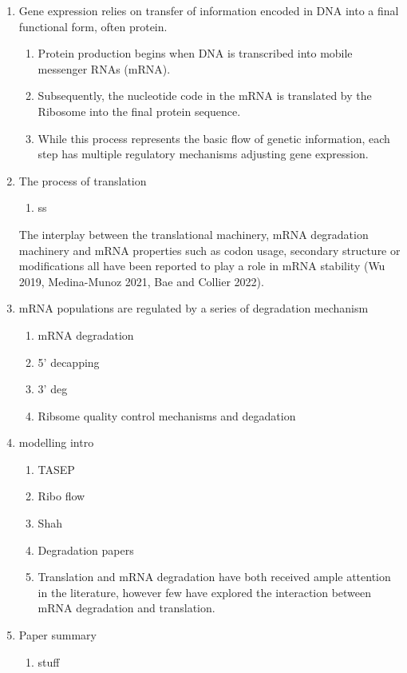 \documentclass[review]{elsarticle}
\begin{document}
\begin{enumerate}
\item Gene expression relies on transfer of information encoded in DNA into a final functional form, often protein. 
\begin{enumerate}	
  \item Protein production begins when DNA is transcribed into mobile messenger RNAs (mRNA).
  \item Subsequently, the nucleotide code in the mRNA is translated by the Ribosome into the final protein sequence. 
  \item While this process represents the basic flow of genetic information, each step has multiple regulatory mechanisms adjusting gene expression.  
\end{enumerate}

\item The process of translation
\begin{enumerate}	
  \item ss
\end{enumerate}

The interplay between the translational machinery, mRNA degradation machinery and mRNA properties such as codon usage, secondary structure or modifications all have been reported to play a role in mRNA stability (Wu 2019, Medina-Munoz 2021, Bae and Collier 2022).


\item mRNA populations are regulated by a series of degradation mechanism
\begin{enumerate}	
  \item mRNA degradation 
  \item 5' decapping
  \item 3' deg
  \item Ribsome quality control mechanisms and degadation
\end{enumerate}

\item modelling intro
\begin{enumerate}	
  \item TASEP
  \item Ribo flow
  \item Shah
  \item Degradation papers
  \item Translation and mRNA degradation have both received ample attention in the literature, however few have explored the interaction between mRNA degradation and translation.
\end{enumerate}

\item Paper summary
\begin{enumerate}	
 \item stuff
\end{enumerate}

\end{enumerate}
\end{document}
